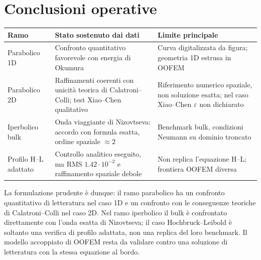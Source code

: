 \documentclass[11pt,a4paper]{article}
\begin{document}
\section{Conclusioni operative}
\begin{center}\begin{tabular}{p{}p{}p{}}
\toprule
Ramo & Stato sostenuto dai dati & Limite principale \\
\midrule
Parabolico 1D & Confronto quantitativo favorevole con energia di Okumura & Curva digitalizzata da figura; geometria 1D estrusa in OOFEM \\
Parabolico 2D & Raffinamenti coerenti con unicità teorica di Calatroni--Colli; test Xiao--Chen qualitativo & Riferimento numerico spaziale, non soluzione esatta; nel caso Xiao--Chen $\varepsilon$ non dichiarato \\
Iperbolico bulk & Onda viaggiante di Nizovtseva: accordo con formula esatta, ordine spaziale $\approx2$ & Benchmark bulk, condizioni Neumann su dominio troncato \\
Profilo H--L adattato & Controllo analitico eseguito, ma RMS $1.42\cdot10^{-2}$ e raffinamento spaziale debole & Non replica l'equazione H--L; frontiera OOFEM diversa \\
\bottomrule
\end{tabular}\end{center}

La formulazione prudente è dunque: il ramo parabolico ha un confronto quantitativo di letteratura nel caso 1D e un confronto con le conseguenze teoriche di Calatroni--Colli nel caso 2D. Nel ramo iperbolico il bulk è confrontato direttamente con l'onda esatta di Nizovtseva; il caso Hochbruck--Leibold è soltanto una verifica di profilo adattata, non una replica del loro benchmark. Il modello accoppiato di OOFEM resta da validare contro una soluzione di letteratura con la stessa equazione al bordo.
\end{document}
